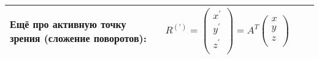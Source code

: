 \documentclass{article}
\begin{document}
\begin{tabular}{ |p{3.8cm}|p{5.7cm}|p{3.8cm}|p{5.7cm}|  }
                                                                             \\ %
\hline
Ещё про активную точку зрения (сложение поворотов):                          &  %
$R^{\left(\prime\right)} =
\left(\begin{array}{c}
x^\prime \\
y^\prime \\
z^\prime \\
\end{array}\right) =
A^{T}
\left(\begin{array}{c}
x \\
y \\
z \\
\end{array}\right)$                                                          &  %
                                                                             &  %
                                                                             \\ %
\hline
\end{tabular}
\end{document}

